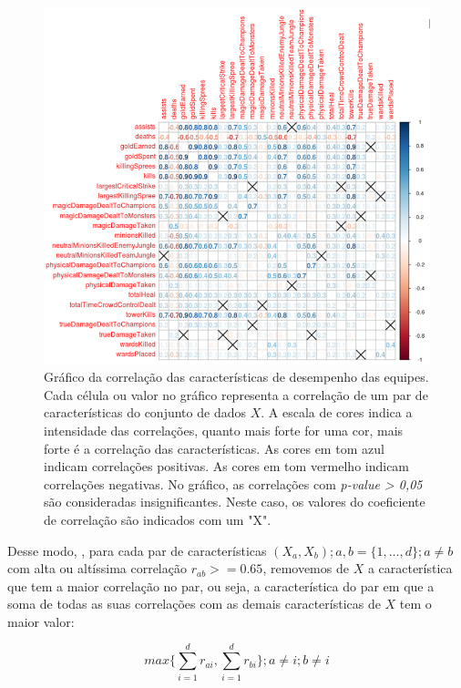 \begin{figure}
  \centering
  \includegraphics[width=1.0\textwidth]{correlations}%
  \caption{Gráfico da correlação das características de desempenho das equipes. Cada c\'elula ou valor no gr\'afico representa a correla\c{c}\~ao de um par de caracter\'isticas do conjunto de dados $X$. A escala de cores indica a intensidade das correla\c{c}\~oes, quanto mais forte for uma cor, mais forte é a correla\c{c}\~ao das caracter\'isticas. As cores em tom azul indicam correla\c{c}\~oes positivas. As cores em tom vermelho indicam correla\c{c}\~oes negativas. No gráfico, as correlações com \textit{p-value > 0,05} são consideradas insignificantes. Neste caso, os valores do coeficiente de correlação são indicados com um "X". }
  \label{fig:correlations}
\end{figure}

Desse modo, , para cada par de características $(X_a, X_b); a, b=\{1, \ldots, d\};a \neq b$ com alta ou altíssima correlação $r_{ab} >= 0.65$, removemos de $X$ a característica que tem a maior correlação no par, ou seja, a característica do par em que a soma de todas as suas correlações com as demais características de $X$ tem o maior valor:

\begin{displaymath}
  max \big\{ \sum_{i=1}^{d} r_{ai} ,  \sum_{i=1}^{d} r_{bi} \big\}; a \neq i; b \neq i
\end{displaymath}


